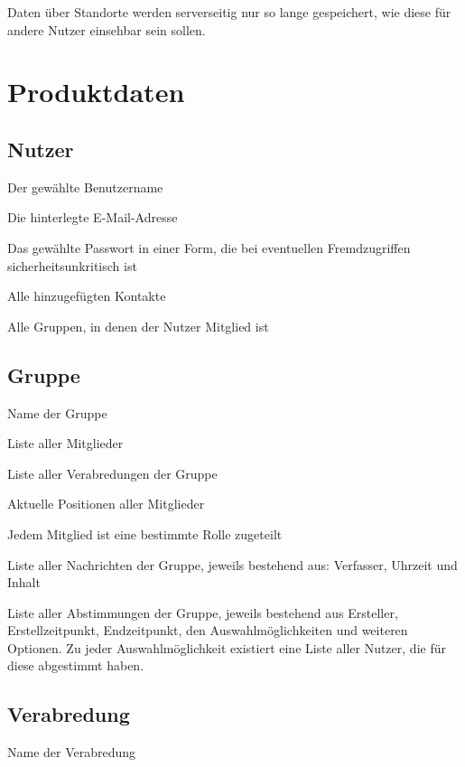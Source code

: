 \documentclass[parskip=full,11pt]{scrartcl}
\begin{document}
Daten über Standorte werden serverseitig nur so lange gespeichert, wie diese
für andere Nutzer einsehbar sein sollen.

\pagebreak
\section{Produktdaten}
\subsection{Nutzer}
Der gewählte Benutzername

Die hinterlegte E-Mail-Adresse

Das gewählte Passwort in einer Form, die bei eventuellen Fremdzugriffen sicherheitsunkritisch ist

Alle hinzugefügten Kontakte

Alle Gruppen, in denen der Nutzer Mitglied ist

\subsection{Gruppe}
Name der Gruppe

Liste aller Mitglieder

Liste aller Verabredungen der Gruppe

Aktuelle Positionen aller Mitglieder

Jedem Mitglied ist eine bestimmte Rolle zugeteilt

Liste aller Nachrichten der Gruppe, jeweils bestehend aus: Verfasser, Uhrzeit und Inhalt

Liste aller Abstimmungen der Gruppe, jeweils bestehend aus Ersteller, Erstellzeitpunkt, Endzeitpunkt, den Auswahlmöglichkeiten und weiteren Optionen. Zu jeder Auswahlmöglichkeit existiert eine Liste aller Nutzer, die für diese abgestimmt haben.

\subsection{Verabredung}
Name der Verabredung
\end{document}

